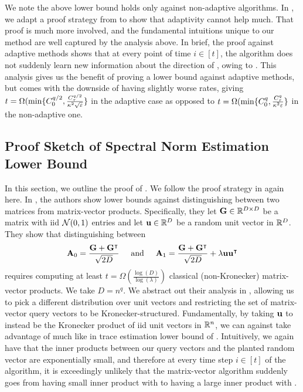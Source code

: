We note the above lower bound holds only against non-adaptive algorithms.
In , we adapt a proof strategy from \cite{simchowitz2017gap} to show that adaptivity cannot help much.
That proof is much more involved, and the fundamental intuitions unique to our method are well captured by the analysis above.
In brief, the proof against adaptive methods shows that at every point of time \(i\in[t]\), the algorithm does not suddenly learn new information about the direction of \vu, owing to .
This analysis gives us the benefit of proving a lower bound against adaptive methods, but comes with the downside of having slightly worse rates, giving \(t = \Omega(\min\{C_0^{q/2}, \frac{C_\tau^{q/2}}{\kappa^2 \sqrt{\varepsilon}}\}\) in the adaptive case as opposed to \(t = \Omega(\min\{C_0^{q}, \frac{C_\tau^{q}}{\kappa^2 \varepsilon}\}\) in the non-adaptive one.



\subsection{Proof Sketch of Spectral Norm Estimation Lower Bound}

In this section, we outline the proof of .
We follow the proof strategy in \cite{simchowitz2017gap} again here.
In \cite{simchowitz2017gap}, the authors show lower bounds against distinguishing between two matrices from matrix-vector products.
Specifically, they let \(\mathbf{G}\in{\mathbb R}^{D \times D}\) be a matrix with iid \({\mathcal N}(0,1)\) entries and let \(\boldsymbol{\mathrm{u}}\in{\mathbb R}^{D}\) be a random unit vector in \({\mathbb R}^D\).
They show that distinguishing between
\[
    \mathbf{A}_0 = \frac{\mathbf{G}+\mathbf{G}^\intercal}{\sqrt{2D}}
    \hspace{0.5cm}\text{and}\hspace{0.5cm}
    \mathbf{A}_1 = \frac{\mathbf{G}+\mathbf{G}^\intercal}{\sqrt{2D}} + \lambda \boldsymbol{\mathrm{u}}\boldsymbol{\mathrm{u}}^\intercal
\]
requires computing at least \(t=\Omega(\frac{\log(D)}{\log(\lambda)})\) classical (non-Kronecker) matrix-vector products.
We take \(D = n^q\).
We abstract out their analysis in , allowing us to pick a different distribution over unit vectors \vu and restricting the set of matrix-vector query vectors to be Kronecker-structured.
Fundamentally, by taking \(\boldsymbol{\mathrm{u}}\) to instead be the Kronecker product of iid unit vectors in \({\mathbb R}^n\), we can against take advantage of  much like in trace estimation lower bound of .
Intuitively, we again have that the inner products between our query vectors and the planted random vector are exponentially small, and therefore at every time step \(i \in [t]\) of the algorithm, it is exceedingly unlikely that the matrix-vector algorithm suddenly goes from having small inner product with \vu to having a large inner product with \vu.

